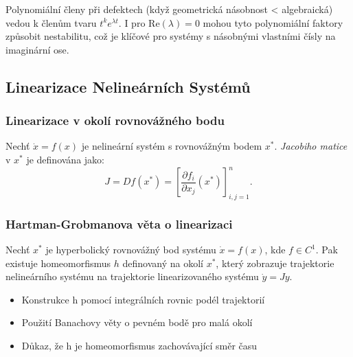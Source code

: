 \begin{keyinsight}
Polynomiální členy při defektech (když geometrická násobnost < algebraická) vedou k členům tvaru $t^k e^{\lambda t}$. I pro $\mathrm{Re}(\lambda) = 0$ mohou tyto polynomiální faktory způsobit nestabilitu, což je klíčové pro systémy s násobnými vlastními čísly na imaginární ose.
\end{keyinsight}

\spc

\subsection{Linearizace Nelineárních Systémů}

\subsubsection{Linearizace v okolí rovnovážného bodu}

\begin{definition}
Nechť $\dot{x} = f(x)$ je nelineární systém s rovnovážným bodem $x^*$. \emph{Jacobiho matice} v $x^*$ je definována jako:
\[
J = Df(x^*) = \left[\frac{\partial f_i}{\partial x_j}(x^*)\right]_{i,j=1}^n.
\]
\end{definition}

\subsubsection{Hartman-Grobmanova věta o linearizaci}

\begin{theorem}
Nechť $x^*$ je hyperbolický rovnovážný bod systému $\dot{x} = f(x)$, kde $f \in C^1$. Pak existuje homeomorfismus $h$ definovaný na okolí $x^*$, který zobrazuje trajektorie nelineárního systému na trajektorie linearizovaného systému $\dot{y} = Jy$.
\end{theorem}

\begin{proofsketch}
\begin{itemize}
\item Konstrukce h pomocí integrálních rovnic podél trajektorií
\item Použití Banachovy věty o pevném bodě pro malá okolí
\item Důkaz, že h je homeomorfismus zachovávající směr času
\end{itemize}
\end{proofsketch}

